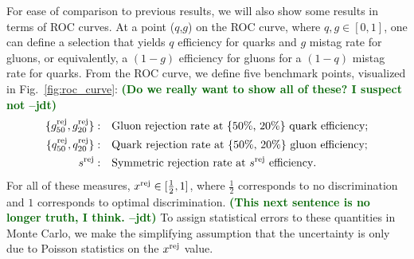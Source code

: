 \documentclass[11pt,letterpaper]{article}
\DeclareRobustCommand{\Fig}[1]{Fig.~\ref{#1}}
\newcommand{\jdt}[1]{\textbf{\textcolor{darkgreen}{(#1 --jdt)}}}
\begin{document}
For ease of comparison to previous results, we will also show some results in terms of ROC curves.  At a point ($q$,$g$) on the ROC curve, where $q,g \in [0,1]$, one can define a selection that yields $q$ efficiency for quarks and $g$ mistag rate for gluons, or equivalently, a $(1-g)$ efficiency for gluons for a $(1-q)$ mistag rate for quarks.  From the ROC curve, we define five benchmark points, visualized in \Fig{fig:roc_curve}:  \jdt{Do we really want to show all of these?  I suspect not}
\begin{align}
\{ g^{\rm  rej}_{50} ,   g^{\rm  rej}_{20}\} : \quad & \text{Gluon rejection rate at \{50\%, 20\%\} quark efficiency}; \\
\{q^{\rm rej}_{50} ,  q^{\rm rej}_{20}\} : \quad & \text{Quark rejection rate at \{50\%, 20\%\} gluon efficiency}; \\
s^{\rm rej} : \quad & \text{Symmetric rejection rate at $s^{\rm rej}$ efficiency}.
\end{align}
For all of these measures, $x^{\rm rej} \in [\frac{1}{2},1]$, where $\frac{1}{2}$ corresponds to no discrimination and $1$ corresponds to optimal discrimination.  \jdt{This next sentence is no longer truth, I think.}  To assign statistical errors to these quantities in Monte Carlo, we make the simplifying assumption that the uncertainty is only due to Poisson statistics on the $x^{\rm rej}$ value.
\end{document}
